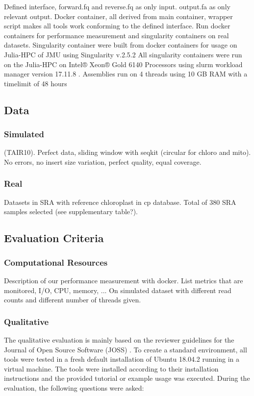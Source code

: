\documentclass{bmcart}
\begin{document}
Defined interface, forward.fq and reverse.fq as only input. output.fa as only relevant output.
Docker container, all derived from main container, wrapper script makes all tools work conforming to the defined interface. Run docker containers for performance measurement and singularity containers on real datasets.
Singularity container were built from docker containers for usage on Julia-HPC of JMU using Singularity v.2.5.2 \cite{kurtzer2017singularity}
All singularity containers were run on the Julia-HPC on Intel® Xeon® Gold 6140 Processors using slurm workload manager version 17.11.8 \cite{Jette02slurm}. Assemblies run on 4 threads using 10 GB RAM with a timelimit of 48 hours 

\subsection*{Data}
\subsubsection*{Simulated}
 (TAIR10). Perfect data, sliding window with seqkit (circular for chloro and mito). No errors, no insert size variation, perfect quality, equal coverage.

\subsubsection*{Real}
Datasets in SRA with reference chloroplast in cp database.
Total of 380 SRA samples selected (see supplementary table?).

\subsection*{Evaluation Criteria}
\subsubsection*{Computational Resources}
Description of our performance measurement with docker. List metrics that are monitored, I/O, CPU, memory, ...
On simulated dataset with different read counts and different number of threads given.

\subsubsection*{Qualitative}

The qualitative evaluation is mainly based on the reviewer guidelines for the Journal of Open Source Software (JOSS) \cite{joss}.
To create a standard environment, all tools were tested in a fresh default installation of Ubuntu 18.04.2 running in a virtual machine. The tools were installed according to their installation instructions and
the provided tutorial or example usage was executed. During the evaluation, the following
questions were asked:
\end{document}
